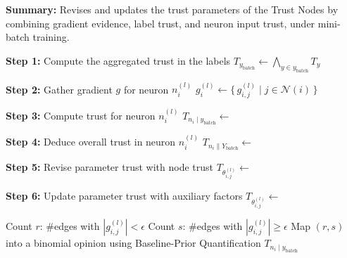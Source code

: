 \begin{algorithm}
\caption{Parameter-Trust Update Algorithm}
\begin{algorithmic}[1]

        \State \textbf{Summary:} Revises and updates the trust parameters of the Trust Nodes by combining gradient evidence, label trust, and neuron input trust, under mini-batch training.

        \State \textbf{Step 1:} Compute the aggregated trust in the labels
        \State $T_{y_\text{batch}}  \longleftarrow  \bigwedge_{y \in y_\text{batch}} T_y$

                \State \textbf{Step 2:} Gather gradient $g$ for neuron $n_i^{(l)}$
                \State $g^{(l)}_i  \longleftarrow  \{\, g^{(l)}_{i,j} \;|\; j \in \mathcal{N}(i)\,\}$

                \State \textbf{Step 3:} Compute trust for neuron $n_i^{(l)}$
                \State $T_{n_i \mid y_\text{batch}}  \longleftarrow $ 

                \State \textbf{Step 4:} Deduce overall trust in neuron $n_i^{(l)}$ 
                \State $T_{n_i \parallel Y_\text{batch}}  \longleftarrow $ 

                    \State \textbf{Step 5:} Revise parameter trust with node trust
                    \State $T_{\theta_{i,j}^{(l)}}  \longleftarrow $ 

                    \State \textbf{Step 6:} Update parameter trust with auxiliary factors
                    \State $T_{\theta_{i,j}^{(l)}} \longleftarrow $ 
                \EndFor
            \EndFor
        \EndFor
    \EndFunction

        \State Count $r$: \#edges with $|g^{(l)}_{i,j}| < \epsilon$ 
        \State Count $s$: \#edges with $|g^{(l)}_{i,j}| \geq \epsilon$ 
        \State Map $(r,s)$ into a binomial opinion using Baseline-Prior Quantification
        \State \Return $T_{n_i \mid y_\text{batch}}$
    \EndFunction


\end{algorithmic}
\end{algorithm}
